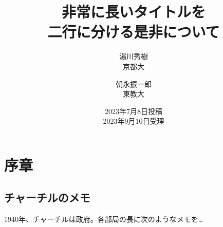 \documentclass{jlreq}
\begin{document}
\title{非常に長いタイトルを \\ 二行に分ける是非について}
\author{湯川秀樹\\ 京都大 \and 朝永振一郎 \\ 東教大} 
\date{2023年7月8日投稿 \\ 2023年9月10日受理}
\maketitle

\section{序章}
\subsection{チャーチルのメモ}
 1940年、チャーチルは政府。各部局の長に次のようなメモを…
\end{document}
